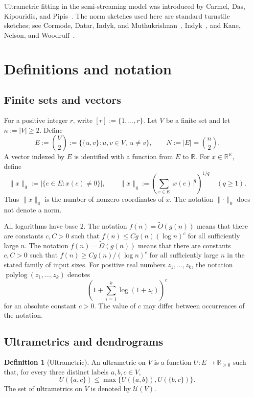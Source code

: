 \documentclass[11pt]{article}
\theoremstyle{definition}
\newtheorem{definition}[theorem]{Definition}
\newcommand{\R}{\mathbb{R}}
\newcommand{\cU}{\mathcal{U}}
\newcommand{\polylog}{\operatorname{polylog}}
\begin{document}
Ultrametric fitting in the semi-streaming model was introduced by Carmel,
Das, Kipouridis, and Pipis~\cite{CarmelDasKipouridisPipis2025}.  The norm
sketches used here are standard turnstile sketches; see
Cormode, Datar, Indyk, and Muthukrishnan~\cite{CormodeDatarIndykMuthukrishnan2003},
Indyk~\cite{Indyk2006}, and Kane, Nelson, and
Woodruff~\cite{KaneNelsonWoodruff2010Norms,KaneNelsonWoodruff2010Distinct}.

\section{Definitions and notation}\label{sec:preliminaries}

\subsection{Finite sets and vectors}

For a positive integer \(r\), write
\([r]:=\{1,\ldots,r\}\).  Let \(V\) be a finite set and let
\(n:=|V|\ge 2\).  Define
\[
 E:=\binom{V}{2}
   :=\bigl\{\{u,v\}:u,v\in V,\ u\ne v\bigr\},
 \qquad
 N:=|E|=\binom n2.
\]
A vector indexed by \(E\) is identified with a function from \(E\) to
\(\R\).  For \(x\in\R^E\), define
\[
 \lVert x\rVert_0
 :=\bigl|\{e\in E:x(e)\ne 0\}\bigr|,
 \qquad
 \lVert x\rVert_q
 :=\left(\sum_{e\in E}|x(e)|^q\right)^{1/q}
 \quad(q\ge 1).
\]
Thus \(\lVert x\rVert_0\) is the number of nonzero coordinates of \(x\).
The notation \(\lVert\cdot\rVert_0\) does not denote a norm.

All logarithms have base \(2\).  The notation \(f(n)=\widetilde O(g(n))\)
means that there are constants \(c,C>0\) such that
\(f(n)\le Cg(n)(\log n)^c\) for all sufficiently large \(n\).  The notation
\(f(n)=\widetilde\Omega(g(n))\) means that there are constants \(c,C>0\)
such that \(f(n)\ge Cg(n)/(\log n)^c\) for all sufficiently large \(n\) in
the stated family of input sizes.
For positive real numbers \(z_1,\ldots,z_k\), the notation
\(\polylog(z_1,\ldots,z_k)\) denotes
\[
 \left(1+\sum_{i=1}^k\log(1+z_i)\right)^c
\]
for an absolute constant \(c>0\).  The value of \(c\) may differ between
occurrences of the notation.

\subsection{Ultrametrics and dendrograms}

\begin{definition}[Ultrametric]
An ultrametric on \(V\) is a function \(U:E\to\R_{\ge 0}\) such that, for
every three distinct labels \(a,b,c\in V\),
\[
 U(\{a,c\})
 \le
 \max\bigl\{U(\{a,b\}),U(\{b,c\})\bigr\}.
\]
The set of ultrametrics on \(V\) is denoted by \(\cU(V)\).
\end{definition}
\end{document}
